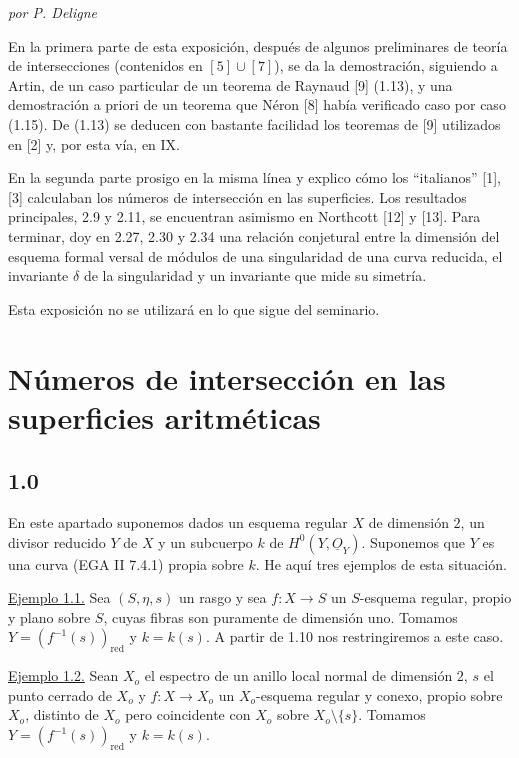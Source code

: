
\pageoriginale


\begin{center}
\textit{por P. Deligne}
\end{center}

En la primera parte de esta exposición, después de algunos preliminares de teoría de
intersecciones (contenidos en $[5]\cup[7]$), se da la demostración, siguiendo a
Artin, de un caso particular de un teorema de Raynaud [9] (1.13), y una
demostración a priori de un teorema que Néron [8] había verificado caso por caso
(1.15). De (1.13) se deducen con bastante facilidad los teoremas de [9]
utilizados en [2] y, por esta vía, en IX.

En la segunda parte prosigo en la misma línea y explico cómo los ``italianos''
[1], [3] calculaban los números de intersección en las superficies. Los
resultados principales, 2.9 y 2.11, se encuentran asimismo en Northcott [12] y
[13]. Para terminar, doy en 2.27, 2.30 y 2.34 una relación conjetural entre la
dimensión del esquema formal versal de módulos de una singularidad de una curva
reducida, el invariante $\delta$ de la singularidad y un invariante que mide su
simetría.

Esta exposición no se utilizará en lo que sigue del seminario.

\section{Números de intersección en las superficies aritméticas}

\subsection*{1.0}
En este apartado suponemos dados un esquema regular $X$ de dimensión $2$, un
divisor reducido $Y$ de $X$ y un subcuerpo $k$ de
$H^0(Y,\underline{O}_Y)$. Suponemos que $Y$ es una curva (EGA II 7.4.1)
propia sobre $k$. He aquí tres ejemplos de esta situación.

\medskip
\noindent\underline{Ejemplo 1.1.}
Sea $(S,\eta,s)$ un rasgo y sea $f:X\longrightarrow S$ un $S$-esquema
regular, propio y plano sobre $S$, cuyas fibras son puramente de dimensión uno.
Tomamos $Y=(f^{-1}(s))_{\mathrm{red}}$ y $k=k(s)$. A partir de 1.10 nos
restringiremos a este caso.

\pageoriginale

\medskip
\noindent\underline{Ejemplo 1.2.}
Sean $X_o$ el espectro de un anillo local normal de dimensión $2$, $s$ el punto
cerrado de $X_o$ y $f:X\longrightarrow X_o$ un $X_o$-esquema regular y
conexo, propio sobre $X_o$, distinto de $X_o$ pero coincidente con $X_o$ sobre
$X_o\setminus\{s\}$. Tomamos $Y=(f^{-1}(s))_{\mathrm{red}}$ y $k=k(s)$.

